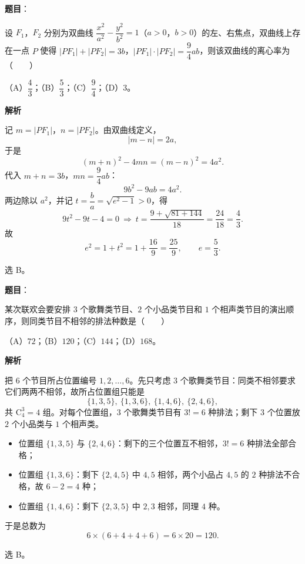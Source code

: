 \begin{answer}

\textbf{题目}：

设 $F_1$，$F_2$ 分别为双曲线 $\dfrac{x^2}{a^2}-\dfrac{y^2}{b^2}=1$（$a>0$，$b>0$）的左、右焦点，双曲线上存在一点 $P$ 使得 $|PF_1|+|PF_2|=3b$，$|PF_1|\cdot|PF_2|=\dfrac94 ab$，则该双曲线的离心率为\mbox{（　　）}

（A）$\dfrac43$；（B）$\dfrac53$；（C）$\dfrac94$；（D）$3$。

\textbf{解析}

记 $m=|PF_1|$，$n=|PF_2|$。由双曲线定义，
\nopagebreak[4]
\[|m-n|=2a,\]
于是
\nopagebreak[4]
\[(m+n)^2-4mn=(m-n)^2=4a^2 .\]
代入 $m+n=3b$，$mn=\dfrac94ab$：
\nopagebreak[4]
\[9b^2-9ab=4a^2 .\]
两边除以 $a^2$，并记 $t=\dfrac ba=\sqrt{e^2-1}>0$，得
\nopagebreak[4]
\[9t^2-9t-4=0\ \Longrightarrow\ t=\frac{9+\sqrt{81+144}}{18}=\frac{24}{18}=\frac43 .\]
故
\nopagebreak[4]
\[e^2=1+t^2=1+\frac{16}9=\frac{25}9,\qquad e=\frac53 .\]

选 B。


\end{answer}
\begin{answer}

\textbf{题目}：

某次联欢会要安排 $3$ 个歌舞类节目、$2$ 个小品类节目和 $1$ 个相声类节目的演出顺序，则同类节目不相邻的排法种数是\mbox{（　　）}

（A）$72$；（B）$120$；（C）$144$；（D）$168$。

\textbf{解析}

把 $6$ 个节目所占位置编号 $1,2,\dots,6$。先只考虑 $3$ 个歌舞类节目：同类不相邻要求它们两两不相邻，故所占位置组只能是
\nopagebreak[4]
\[\{1,3,5\},\ \{1,3,6\},\ \{1,4,6\},\ \{2,4,6\},\]
共 $\mathrm C_4^3=4$ 组。对每个位置组，$3$ 个歌舞类节目有 $3!=6$ 种排法；剩下 $3$ 个位置放 $2$ 个小品类与 $1$ 个相声类。

\begin{itemize}
\item 位置组 $\{1,3,5\}$ 与 $\{2,4,6\}$：剩下的三个位置互不相邻，$3!=6$ 种排法全部合格；
\item 位置组 $\{1,3,6\}$：剩下 $\{2,4,5\}$ 中 $4,5$ 相邻，两个小品占 $4,5$ 的 $2$ 种排法不合格，故 $6-2=4$ 种；
\item 位置组 $\{1,4,6\}$：剩下 $\{2,3,5\}$ 中 $2,3$ 相邻，同理 $4$ 种。
\end{itemize}

于是总数为
\nopagebreak[4]
\[6\times(6+4+4+6)=6\times20=120 .\]

选 B。


\end{answer}
